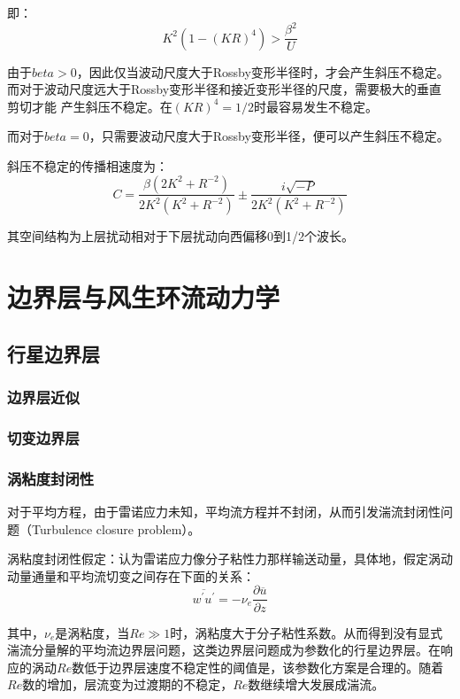 \documentclass{article}
\begin{document}
即：
$$K^2(1-(KR)^4) > \frac{\beta^2}{U}$$

由于$beta>0$，因此仅当波动尺度大于Rossby变形半径时，才会产生斜压不稳定。
而对于波动尺度远大于Rossby变形半径和接近变形半径的尺度，需要极大的垂直剪切才能
产生斜压不稳定。在$(KR)^4 = 1/2$时最容易发生不稳定。

而对于$beta = 0$，只需要波动尺度大于Rossby变形半径，便可以产生斜压不稳定。

斜压不稳定的传播相速度为：
$$C = \frac{\beta(2K^2+R^{-2})}{2K^2(K^2+R^{-2})}\pm\frac{i\sqrt{-P}}{2K^2(K^2+R^{-2})}$$

其空间结构为上层扰动相对于下层扰动向西偏移0到1/2个波长。

\newpage

\section{边界层与风生环流动力学}
\subsection{行星边界层}
\subsubsection{边界层近似}
\subsubsection{切变边界层}
\subsubsection{涡粘度封闭性}
对于平均方程，由于雷诺应力未知，平均流方程并不封闭，从而引发湍流封闭性问题（Turbulence closure problem）。

涡粘度封闭性假定：认为雷诺应力像分子粘性力那样输送动量，具体地，假定涡动动量通量和平均流切变之间存在下面的关系：
$$\overline{{w}^{\prime}{u}^{\prime}}=-{{\nu }_{e}}\frac{\partial \overline{u}}{\partial z}$$

其中，${\nu }_{e}$是涡粘度，当$Re \gg 1$时，涡粘度大于分子粘性系数。从而得到没有显式湍流分量解的平均流边界层问题，这类边界层问题成为参数化的行星边界层。在响应的涡动$Re$数低于边界层速度不稳定性的阈值是，该参数化方案是合理的。随着$Re$数的增加，层流变为过渡期的不稳定，$Re$数继续增大发展成湍流。
\end{document}

